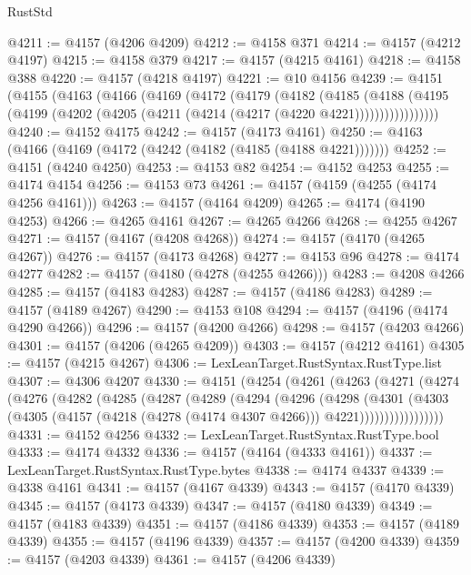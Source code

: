\begin{lexlean}{RustStd}
\begin{coremodule}
@4211 := @4157 (@4206 @4209)
@4212 := @4158 @371
@4214 := @4157 (@4212 @4197)
@4215 := @4158 @379
@4217 := @4157 (@4215 @4161)
@4218 := @4158 @388
@4220 := @4157 (@4218 @4197)
@4221 := @10 @4156
@4239 := @4151
    (@4155
      (@4163
        (@4166
          (@4169
            (@4172
              (@4179
                (@4182
                  (@4185
                    (@4188
                      (@4195 (@4199 (@4202 (@4205 (@4211 (@4214 (@4217 (@4220 @4221)))))))))))))))))
@4240 := @4152 @4175
@4242 := @4157 (@4173 @4161)
@4250 := @4163 (@4166 (@4169 (@4172 (@4242 (@4182 (@4185 (@4188 @4221)))))))
@4252 := @4151 (@4240 @4250)
@4253 := @4153 @82
@4254 := @4152 @4253
@4255 := @4174 @4154
@4256 := @4153 @73
@4261 := @4157 (@4159 (@4255 (@4174 @4256 @4161)))
@4263 := @4157 (@4164 @4209)
@4265 := @4174 (@4190 @4253)
@4266 := @4265 @4161
@4267 := @4265 @4266
@4268 := @4255 @4267
@4271 := @4157 (@4167 (@4208 @4268))
@4274 := @4157 (@4170 (@4265 @4267))
@4276 := @4157 (@4173 @4268)
@4277 := @4153 @96
@4278 := @4174 @4277
@4282 := @4157 (@4180 (@4278 (@4255 @4266)))
@4283 := @4208 @4266
@4285 := @4157 (@4183 @4283)
@4287 := @4157 (@4186 @4283)
@4289 := @4157 (@4189 @4267)
@4290 := @4153 @108
@4294 := @4157 (@4196 (@4174 @4290 @4266))
@4296 := @4157 (@4200 @4266)
@4298 := @4157 (@4203 @4266)
@4301 := @4157 (@4206 (@4265 @4209))
@4303 := @4157 (@4212 @4161)
@4305 := @4157 (@4215 @4267)
@4306 := LexLeanTarget.RustSyntax.RustType.list
@4307 := @4306 @4207
@4330 := @4151
    (@4254
      (@4261
        (@4263
          (@4271
            (@4274
              (@4276
                (@4282
                  (@4285
                    (@4287
                      (@4289
                        (@4294
                          (@4296
                            (@4298
                              (@4301
                                (@4303
                                  (@4305
                                    (@4157
                                      (@4218 (@4278 (@4174 @4307 @4266)))
                                      @4221)))))))))))))))))
@4331 := @4152 @4256
@4332 := LexLeanTarget.RustSyntax.RustType.bool
@4333 := @4174 @4332
@4336 := @4157 (@4164 (@4333 @4161))
@4337 := LexLeanTarget.RustSyntax.RustType.bytes
@4338 := @4174 @4337
@4339 := @4338 @4161
@4341 := @4157 (@4167 @4339)
@4343 := @4157 (@4170 @4339)
@4345 := @4157 (@4173 @4339)
@4347 := @4157 (@4180 @4339)
@4349 := @4157 (@4183 @4339)
@4351 := @4157 (@4186 @4339)
@4353 := @4157 (@4189 @4339)
@4355 := @4157 (@4196 @4339)
@4357 := @4157 (@4200 @4339)
@4359 := @4157 (@4203 @4339)
@4361 := @4157 (@4206 @4339)

\end{coremodule}
\end{lexlean}
